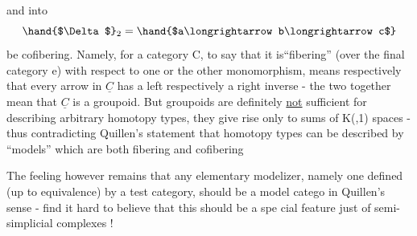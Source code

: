  \quad and \quad {}
into
\[ \hand{$\Delta$}_2 = \hand{$a\longrightarrow b\longrightarrow c$} \]
be cofibering. Namely, for a category C, to say that it is``fibering''
(over the final category e) with respect to one or the other monomorphism,
means respectively that every arrow in $\underline{C}$ has a left respectively a right
inverse - the two together mean that $\underline{C}$ is a groupoid. But groupoids are
definitely \uline{not} sufficient for describing arbitrary homotopy types, they
give rise only to sums of K(\hand{$\pi$},1) spaces \xout{\unsure{(}} - thus contradicting Quillen's
statement that homotopy types can be described by ``models'' which are both
fibering and cofibering\hand{!}

The feeling however remains that any elementary modelizer, namely one
defined (up to equivalence) by a test category, should be a  model catego
in Quillen's sense -  find it hard to believe that this should be a spe%
cial feature just of semi-simplicial complexes !

